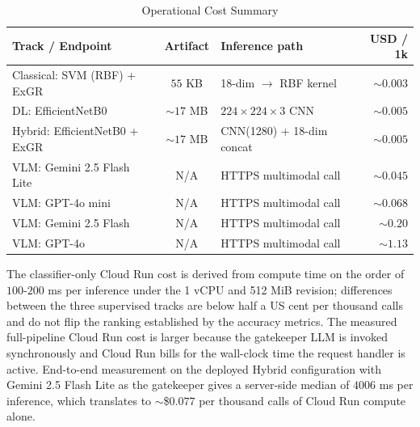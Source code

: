 \begin{table}[H]
    \centering
    \caption{Operational Cost Summary}
    \label{tab:cost-summary}
    \footnotesize
    \setlength{\tabcolsep}{4pt}
    \renewcommand{\arraystretch}{1.15}
    \begin{tabular}{@{}p{55mm}cp{45mm}r@{}}
        \hline
        Track / Endpoint & Artifact & Inference path & USD / 1k \\
        \hline
        Classical: SVM (RBF) + ExGR    & $55$ KB        & 18-dim $\rightarrow$ RBF kernel        & $\sim 0.003$  \\
        DL: EfficientNetB0             & $\sim 17$ MB   & $224{\times}224{\times}3$ CNN          & $\sim 0.005$  \\
        Hybrid: EfficientNetB0 + ExGR  & $\sim 17$ MB   & CNN(1280) + 18-dim concat              & $\sim 0.005$  \\
        VLM: Gemini 2.5 Flash Lite     & N/A            & HTTPS multimodal call                  & $\sim 0.045$  \\
        VLM: GPT-4o mini               & N/A            & HTTPS multimodal call                  & $\sim 0.068$  \\
        VLM: Gemini 2.5 Flash          & N/A            & HTTPS multimodal call                  & $\sim 0.20$   \\
        VLM: GPT-4o                    & N/A            & HTTPS multimodal call                  & $\sim 1.13$   \\
        \hline
    \end{tabular}
\end{table}

The classifier-only Cloud Run cost is derived from compute time on the order of $100$-$200$ ms per inference under the 1 vCPU and 512 MiB revision; differences between the three supervised tracks are below half a US cent per thousand calls and do not flip the ranking established by the accuracy metrics. The measured full-pipeline Cloud Run cost is larger because the gatekeeper LLM is invoked synchronously and Cloud Run bills for the wall-clock time the request handler is active. End-to-end measurement on the deployed Hybrid configuration with Gemini 2.5 Flash Lite as the gatekeeper gives a server-side median of $4006$ ms per inference, which translates to $\sim$\$$0.077$ per thousand calls of Cloud Run compute alone.

